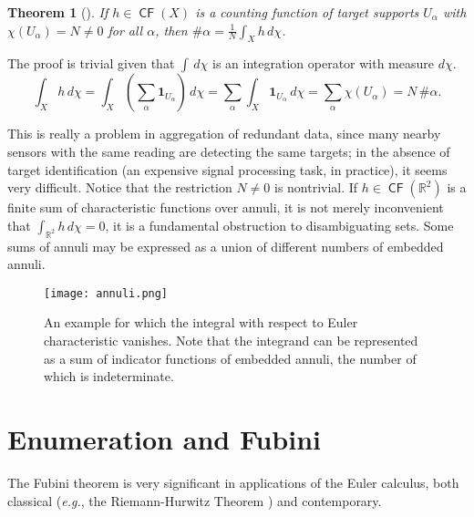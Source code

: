 \documentclass{psapm-l}
\newtheorem{theorem}{Theorem}[section]
\theoremstyle{definition}
\theoremstyle{remark}
\numberwithin{equation}{section}
\begin{document}
\begin{theorem}[\cite{BG:enum}]
\label{thm:enumerate}
If $h\in{{{\operatorname{\mathsf{{CF}}}}}}(X)$ is a counting function of target supports $U_\alpha$ with $\chi(U_\alpha)=N\neq 0$ for all $\alpha$, then $\#\alpha=\frac{1}{N}\int_Xh\,d\chi$.
\end{theorem}
The proof is trivial given that $\int\,d\chi$ is an integration operator with measure $d\chi$.
\begin{equation}
    \int_X h\,d\chi
    =
    \int_X \left(\sum_\alpha {{\mathbf{1}}}_{U_\alpha}\right) \,d\chi
    =
    \sum_\alpha \int_X {{\mathbf{1}}}_{U_\alpha}\,d\chi
    =
    \sum_\alpha \chi(U_\alpha)
    =
    N\,\#\alpha
.
\end{equation}

This is really a problem in aggregation of redundant data, since many nearby sensors with the same reading are detecting the same targets; in the absence of target identification (an expensive signal processing task, in practice), it seems very difficult. Notice that the restriction $N\neq 0$ is nontrivial. If $h\in{{{\operatorname{\mathsf{{CF}}}}}}({{\mathbb R}}^2)$ is a finite sum of characteristic functions over annuli, it is not merely inconvenient that $\int_{{{\mathbb R}}^2} h\,d\chi=0$, it is a fundamental obstruction to disambiguating sets. Some sums of annuli may be expressed as a union of different numbers of embedded annuli.

\begin{figure}[hbt]
\begin{center}
\texttt{[image: annuli.png]}
\caption{An example for which the integral with respect to Euler characteristic vanishes. Note that the integrand can be represented as a sum of indicator functions of embedded annuli, the number of which is indeterminate.}
\label{fig:annuli}
\end{center}
\end{figure}

\section{Enumeration and Fubini}
\label{sec:fubini}

The Fubini theorem is very significant in applications of the Euler calculus, both classical ({{\em e.g.}}, the Riemann-Hurwitz Theorem \cite{Viro,GZ}) and contemporary.
\end{document}
